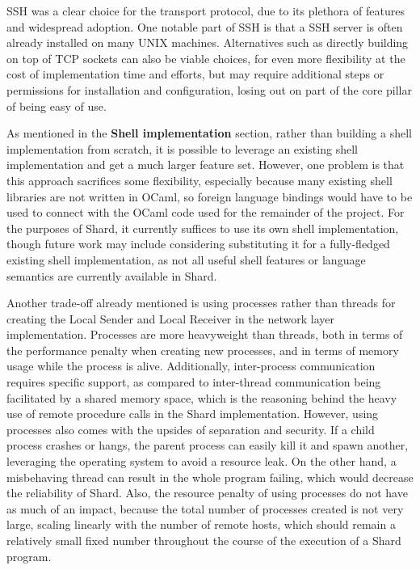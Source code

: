 \documentclass[oneside]{report}
\begin{document}
SSH was a clear choice for the transport protocol, due to its plethora of features and widespread adoption.
One notable part of SSH is that a SSH server is often already installed on many UNIX machines.
Alternatives such as directly building on top of TCP sockets can also be viable choices, for even more flexibility at the cost of implementation time and efforts, but may require additional steps or permissions for installation and configuration, losing out on part of the core pillar of being easy of use.

As mentioned in the \textbf{Shell implementation} section, rather than building a shell implementation from scratch, it is possible to leverage an existing shell implementation and get a much larger feature set.
However, one problem is that this approach sacrifices some flexibility, especially because many existing shell libraries are not written in OCaml, so foreign language bindings would have to be used to connect with the OCaml code used for the remainder of the project.
For the purposes of Shard, it currently suffices to use its own shell implementation, though future work may include considering substituting it for a fully-fledged existing shell implementation, as not all useful shell features or language semantics are currently available in Shard.

Another trade-off already mentioned is using processes rather than threads for creating the Local Sender and Local Receiver in the network layer implementation.
Processes are more heavyweight than threads, both in terms of the performance penalty when creating new processes, and in terms of memory usage while the process is alive.
Additionally, inter-process communication requires specific support, as compared to inter-thread communication being facilitated by a shared memory space, which is the reasoning behind the heavy use of remote procedure calls in the Shard implementation.
However, using processes also comes with the upsides of separation and security.
If a child process crashes or hangs, the parent process can easily kill it and spawn another, leveraging the operating system to avoid a resource leak.
On the other hand, a misbehaving thread can result in the whole program failing, which would decrease the reliability of Shard.
Also, the resource penalty of using processes do not have as much of an impact, because the total number of processes created is not very large, scaling linearly with the number of remote hosts, which should remain a relatively small fixed number throughout the course of the execution of a Shard program.
\end{document}

